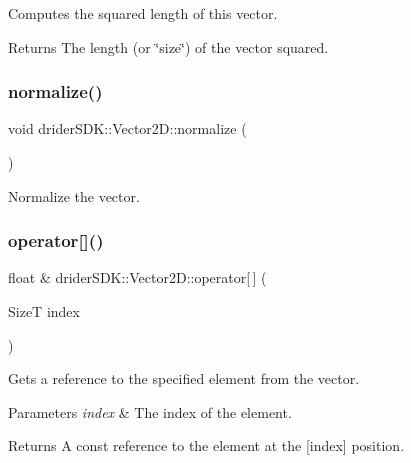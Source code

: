 Computes the squared length of this vector.

\begin{DoxyReturn}{Returns}
The length (or \char`\"{}size\char`\"{}) of the vector squared. 
\end{DoxyReturn}
\mbox{\label{classdrider_s_d_k_1_1_vector2_d_a67697bc0a38ec9f9d7cf072ba2c82a77}} 
\subsubsection{\texorpdfstring{normalize()}{normalize()}}
{\footnotesize\ttfamily void drider\+S\+D\+K\+::\+Vector2\+D\+::normalize (\begin{DoxyParamCaption}{ }\end{DoxyParamCaption})}

Normalize the vector. \mbox{\label{classdrider_s_d_k_1_1_vector2_d_a9aece4842a4d26f5cd069c8c02460db4}} 
\subsubsection{\texorpdfstring{operator[]()}{operator[]()}\hspace{0.1cm}{\footnotesize\ttfamily [1/2]}}
{\footnotesize\ttfamily float \& drider\+S\+D\+K\+::\+Vector2\+D\+::operator\mbox{[}$\,$\mbox{]} (\begin{DoxyParamCaption}\item[{SizeT}]{index }\end{DoxyParamCaption})}

Gets a reference to the specified element from the vector.


\begin{DoxyParams}{Parameters}
{\em index} & The index of the element.\\
\hline
\end{DoxyParams}
\begin{DoxyReturn}{Returns}
A const reference to the element at the \mbox{[}index\mbox{]} position.
\end{DoxyReturn}

